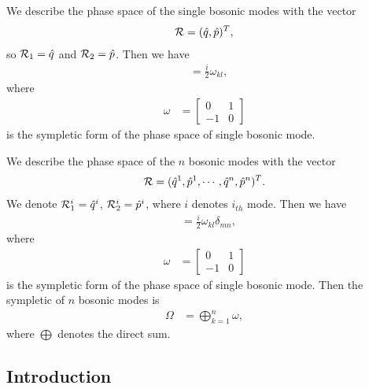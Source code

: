 \documentclass[../../note.tex]{subfiles}
\begin{document}
\begin{lemma}
    We describe the phase space of the single bosonic modes with the vector
    \begin{align}
        \mathcal{R} = (\hat{q}, \hat{p})^T,
    \end{align}
    so $\mathcal{R}_1 = \hat{q}$ and $\mathcal{R}_2 = \hat{p}$. Then we have
    \begin{align}
        [\cR_k, \cR_l]
        &= \frac{i}{2} \omega_{kl},
    \end{align}
    where 
    \begin{align}
        \omega
       &= \left[ \begin{matrix}
            0 & 1 \\
            -1 & 0
        \end{matrix}
        \right]
    \end{align}
    is the sympletic form of the phase space of single bosonic mode.
\end{lemma}

\begin{lemma}
    We describe the phase space of the $n$ bosonic modes with the vector
    \begin{align}
        \mathcal{R} = (\hat{q}^1, \hat{p}^1, \cdots, \hat{q}^n, \hat{p}^n)^T.
    \end{align}
    We denote $\mathcal{R}_1^i = \hat{q}^i$, $\mathcal{R}_2^i = \hat{p}^i$, where $i$ denotes $i_{th}$ mode. Then we have
    \begin{align}
        [\cR_k^m, \cR_l^n]
        &= \frac{i}{2} \omega_{kl} \delta_{mn},
    \end{align}
    where 
    \begin{align}
        \omega
       &= \left[ \begin{matrix}
            0 & 1 \\
            -1 & 0
        \end{matrix}
        \right]
    \end{align}
    is the sympletic form of the phase space of single bosonic mode. Then the sympletic of $n$ bosonic modes is
    \begin{align}
        \Omega
        &= \bigoplus_{k=1}^n \omega,
    \end{align}
    where $\bigoplus$ denotes the direct sum.
\end{lemma}


\subsection{Introduction}
\end{document}
